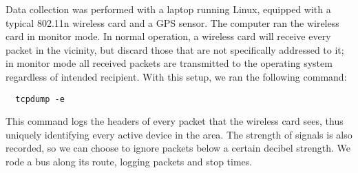Data collection was performed with a laptop running Linux, equipped with a typical 802.11n wireless card and a GPS sensor.
The computer ran the wireless card in monitor mode.
In normal operation, a wireless card will receive every packet in the vicinity, but discard those that are not specifically addressed to it; in monitor mode all received packets are transmitted to the operating system regardless of intended recipient. With this setup, we ran the following command:
\begin{verbatim}
  tcpdump -e
\end{verbatim}
This command logs the headers of every packet that the wireless card sees, thus uniquely identifying every active device in the area.
The strength of signals is also recorded, so we can choose to ignore packets below a certain decibel strength.
We rode a bus along its route, logging packets and stop times. %
